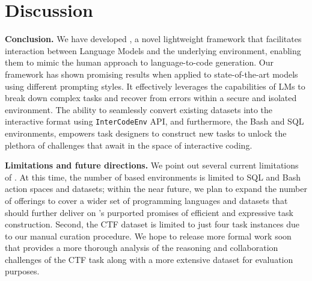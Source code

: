 \section{Discussion}
\label{sec:conclusion}

\textbf{Conclusion.} We have developed \benchmark{}, a novel lightweight framework that facilitates interaction between Language Models and the underlying environment, enabling them to mimic the human approach to language-to-code generation. Our framework has shown promising results when applied to state-of-the-art models using different prompting styles. It effectively leverages the capabilities of LMs to break down complex tasks and recover from errors within a secure and isolated environment. The ability to seamlessly convert existing datasets into the interactive format using \texttt{InterCodeEnv} API, and furthermore, the Bash and SQL environments, empowers task designers to construct new tasks to unlock the plethora of challenges that await in the space of interactive coding.

\textbf{Limitations and future directions.} We point out several current limitations of \benchmark{}. At this time, the number of \benchmark{} based environments is limited to SQL and Bash action spaces and datasets; within the near future, we plan to expand the number of offerings to cover a wider set of programming languages and datasets that should further deliver on \benchmark{}'s purported promises of efficient and expressive task construction. Second, the CTF dataset is limited to just four task instances due to our manual curation procedure. We hope to release more formal work soon that provides a more thorough analysis of the reasoning and collaboration challenges of the CTF task along with a more extensive dataset for evaluation purposes.